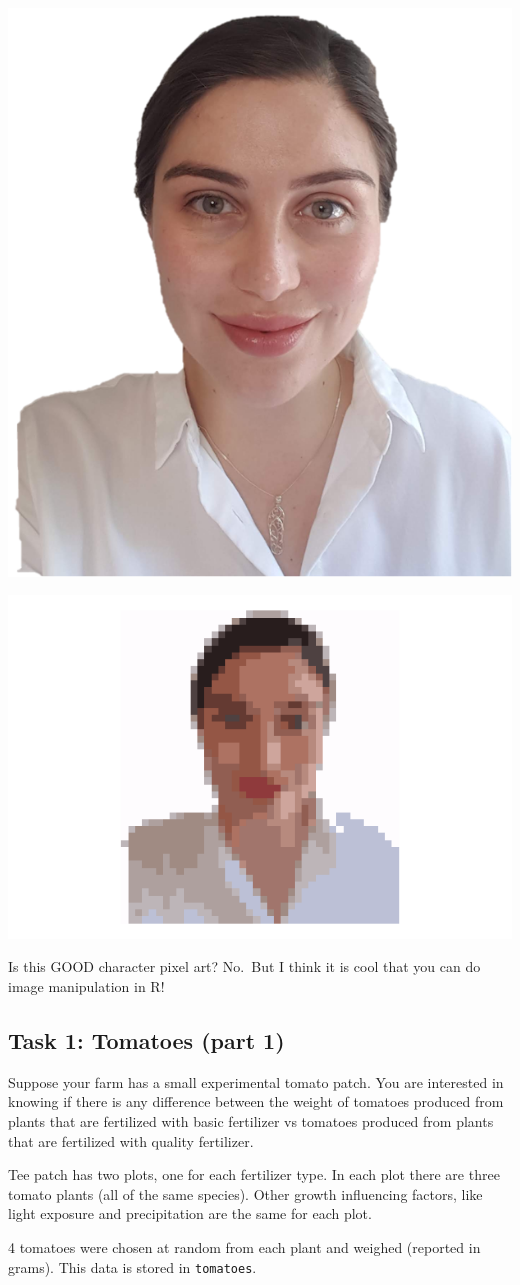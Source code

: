 \documentclass[
  openany]{book}
\begin{document}
\begin{center}\includegraphics[width=0.25\linewidth]{images/m3/lb-for-statdew-valley} \end{center}

\begin{center}\includegraphics[width=0.5\linewidth]{images/m3/lb-example} \end{center}

Is this GOOD character pixel art? No.~But I think it is cool that you can do image manipulation in R!

\hypertarget{task-1-tomatoes-part-1}{%
\subsection{Task 1: Tomatoes (part 1)}\label{task-1-tomatoes-part-1}}

Suppose your farm has a small experimental tomato patch. You are interested in knowing if there is any difference between the weight of tomatoes produced from plants that are fertilized with basic fertilizer vs tomatoes produced from plants that are fertilized with quality fertilizer.

Tee patch has two plots, one for each fertilizer type. In each plot there are three tomato plants (all of the same species). Other growth influencing factors, like light exposure and precipitation are the same for each plot.

4 tomatoes were chosen at random from each plant and weighed (reported in grams). This data is stored in \texttt{tomatoes}.
\end{document}
